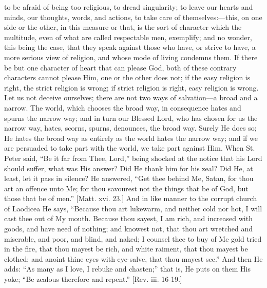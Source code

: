 to be afraid of being too religious, to dread singularity; to leave
our hearts and minds, our thoughts, words, and actions, to take care
of themselves:—this, on one side or the other, in this measure or
that, is the sort of character which the multitude, even of what are
called respectable men, exemplify; and no wonder, this being the case,
that they speak against those who have, or strive to have, a more
serious view of religion, and whose mode of living condemns them. If
there be but one character of heart that can please God, both of these
contrary characters cannot please Him, one or the other does not; if
the easy religion is right, the strict religion is wrong; if strict
religion is right, easy religion is wrong. Let us not deceive
ourselves; there are not two ways of salvation—a broad and a narrow.
The world, which chooses the broad way, in consequence hates and
spurns the narrow way; and in turn our Blessed Lord, who has chosen
for us the narrow way, hates, scorns, spurns, denounces, the broad
way. Surely He does so; He hates the broad way as entirely as the
world hates the narrow way; and if we are persuaded to take part with
the world, we take part against Him. When St. Peter said, ``Be it
far from Thee, Lord,'' being shocked at the notice that his Lord
should suffer, what was His answer? Did He thank him for his zeal? Did
He, at least, let it pass in silence? He answered, ``Get thee
behind Me, Satan, for thou art an offence unto Me; for thou savourest
not the things that be of God, but those that be of men.'' [Matt.
xvi. 23.] And in like manner to the corrupt church of Laodicea He
says, ``Because thou art lukewarm, and neither cold nor hot, I
will cast thee out of My mouth. Because thou sayest, I am rich, and
increased with goods, and have need of nothing; and knowest not, that
thou art wretched and miserable, and poor, and blind, and naked; I
counsel thee to buy of Me gold tried in the fire, that thou mayest be
rich, and white raiment, that thou mayest be clothed; and anoint thine
eyes with eye-salve, that thou mayest see.'' And then He adds:
``As many as I love, I rebuke and chasten;'' that is, He puts
on them His yoke; ``Be zealous therefore and repent.'' [Rev.
iii. 16-19.]


